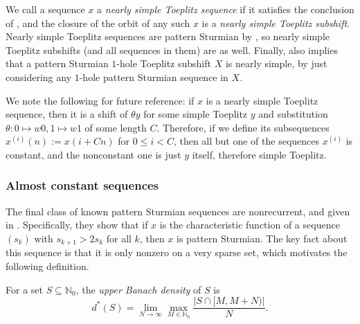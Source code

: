 \documentclass[11pt,reqno]{amsart}
\theoremstyle{definition}
\theoremstyle{plain}
\newcommand{\N}{\mathbb{N}}
\newcommand{\AuthornoteA}[2]{{\sf\small\color{magenta}{[#1: #2]}}}
\newcommand{\AuthornoteR}[2]{{\sf\small\color{blue}{[#1: #2]}}}
\newcommand{\Anote}{\AuthornoteA{A}}
\newcommand{\rp}{\AuthornoteR{R}}
\begin{document}



We call a sequence $x$ a \emph{nearly simple Toeplitz sequence} if it satisfies the conclusion of , and the closure of the orbit of any such $x$ is a \emph{nearly simple Toeplitz subshift}. Nearly simple Toeplitz sequences are pattern Sturmian by , so nearly simple Toeplitz subshifts (and all sequences in them) are as well. Finally,  also implies that a pattern Sturmian $1$-hole Toeplitz subshift $X$ is nearly simple, by just considering any $1$-hole pattern Sturmian sequence in $X$.

We note the following for future reference: if $x$ is a nearly simple Toeplitz sequence, then it is a shift of $\theta y$ for some simple Toeplitz $y$ and substitution $\theta: 0 \mapsto w0, 1 \mapsto w1$ of some length $C$. Therefore, if we define its subsequences
$x^{(i)}(n) := x(i + Cn)$ for $0 \leq i < C$, then all but one of the sequences $x^{(i)}$ is constant, and the nonconstant one is just $y$ itself, therefore simple Toeplitz.

\subsubsection{Almost constant sequences}

The final class of known pattern Sturmian sequences are nonrecurrent, and given in \cite{Kamae-Zamboni-sequence_entropy}. Specifically, they show that if $x$ is the characteristic function of a sequence $(s_k)$ with $s_{k+1} > 2s_k$ for all $k$, then $x$ is pattern Sturmian. The key fact about this sequence is that it is only nonzero on a very sparse set, which motivates the following definition.

For a set $S \subseteq \N_0$, the \emph{upper Banach density} of $S$ is 
\[
    d^*(S) = \lim_{N \to \infty} \max_{M \in \N_0} \frac{|S \cap [M, M + N)|}{N}.
\]
\end{document}
